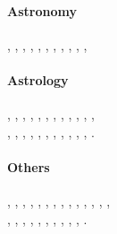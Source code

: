 \documentclass{article}
\begin{document}
\paragraph{Astronomy}
\Sun,
\Moon,
\Mercury,
\Venus,
\Mars,
\Jupiter,
\Saturn,
\Uranus,
\Neptune,
\Pluto,
\Earth,

\paragraph{Astrology}
\Aries,
\Taurus,
\Gemini,
\Cancer,
\Leo,
\Virgo,
\Libra,
\Scorpio,
\Sagittarius,
\Capricorn,
\Aquarius,
\Pisces,
\\
,
,
,
,
,
,
,
,
,
,
,
.

\paragraph{Others}
\YinYang,
\Yingyang,
\MVRightArrow,
\MVRightarrow,
\MVAt,
\BOLogo,
\BOLogoL,
\BOLogoP,
\FHBOlogo,
\Mundus,
\Cross,
\CeltCross,
\Celtcross,
\Ankh,
\\
\Heart,
\CircledA,
\Bouquet,
\Frowny,
\Smiley,
\PeaceDove,
\Bat,
\WomanFace,
\Womanface,
\ManFace,
\MartinVogel.
\end{document}
